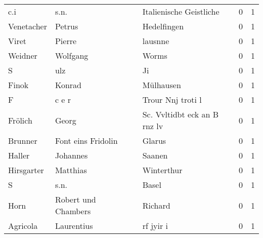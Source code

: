 \documentclass[10pt,a4paper,landscape]{article}
\begin{document}
\begin{longtable}{llllrr}
                      c.i &                               s.n. &             &                     Italienische Geistliche &          0 &         1 \\
               Venetacher &                             Petrus &             &                                 Hedelfingen &          0 &         1 \\
                    Viret &                             Pierre &             &                                     lausnne &          0 &         1 \\
                  Weidner &                           Wolfgang &             &                                       Worms &          0 &         1 \\
                        S &                                ulz &             &                                          Ji &          0 &         1 \\
                    Finok &                             Konrad &             &                                   Mülhausen &          0 &         1 \\
                        F &                              c e r &             &                           Trour Nnj troti l &          0 &         1 \\
                  Frölich &                              Georg &             &                Sc. Vvltidbt eck an B rnz lv &          0 &         1 \\
                  Brunner &                 Font eins Fridolin &             &                                      Glarus &          0 &         1 \\
                   Haller &                           Johannes &             &                                      Saanen &          0 &         1 \\
               Hirsgarter &                           Matthias &             &                                  Winterthur &          0 &         1 \\
                        S &                               s.n. &             &                                       Basel &          0 &         1 \\
                     Horn &                Robert und Chambers &             &                                     Richard &          0 &         1 \\
                 Agricola &                         Laurentius &             &                                   rf jyir i &          0 &         1 \\

\end{longtable}
\end{document}
